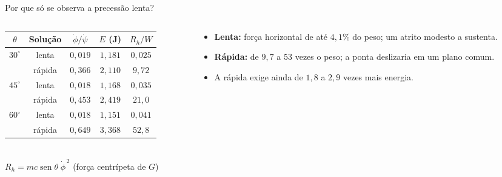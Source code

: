 \documentclass[11pt,aspectratio=169]{beamer}
\newcommand{\seno}{\operatorname{sen}}
\newcommand{\phid}{\dot{\phi}}
\newcommand{\psid}{\dot{\psi}}
\begin{document}
\begin{frame}{Por que só se observa a precessão lenta?}
  \begin{columns}[c]
    \begin{column}{0.56\textwidth}
      \centering\small
      \begin{tabular}{ccccc}
        \toprule
        $\theta$ & Solução & $\phid/\psid$ & $E$ (J) & $R_h/W$\\
        \midrule
        $30^\circ$ & lenta & $0,019$ & $1,181$ & $0,025$\\
                   & rápida & $0,366$ & $2,110$ & $9,72$\\
        $45^\circ$ & lenta & $0,018$ & $1,168$ & $0,035$\\
                   & rápida & $0,453$ & $2,419$ & $21,0$\\
        $60^\circ$ & lenta & $0,018$ & $1,151$ & $0,041$\\
                   & rápida & $0,649$ & $3,368$ & $52,8$\\
        \bottomrule
      \end{tabular}\\[0.3cm]
      $R_h=mc\seno\theta\;\phid^{\,2}$ \quad (força centrípeta de $G$)
    \end{column}
    \begin{column}{0.4\textwidth}
      \begin{itemize}
        \item \textbf{Lenta:} força horizontal de até $4,1\%$ do peso; um atrito modesto a sustenta.
        \item \textbf{Rápida:} de $9,7$ a $53$ vezes o peso; a ponta deslizaria em um plano comum.
        \item A rápida exige ainda de $1,8$ a $2,9$ vezes mais energia.
      \end{itemize}
    \end{column}
  \end{columns}
\end{frame}
\end{document}
